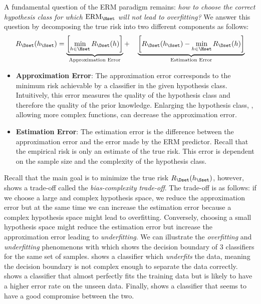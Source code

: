 A fundamental question of the ERM paradigm remains: \emph{how to choose the correct hypothesis class for which $\text{ERM}_\Hset$ will not lead to overfitting?} 
We answer this question by decomposing the true risk into two different components as follows: 
\begin{equation} \label{equation:ch2-bias_complexity_tradeoff}
  R_\Dset (h_\Sset) = 
  \underbrace{\left[ \min_{h \in \Hset} R_\Dset(h) \right]}_{\text{\scriptsize Approximation Error}} + \quad 
  \underbrace{\left[ R_\Dset(h_\Sset) - \min_{h \in \Hset} R_\Dset(h) \right]}_{\text{\scriptsize Estimation Error}} 
\end{equation}
\begin{itemize}
  \item \textbf{Approximation Error}: The approximation error corresponds to the minimum risk achievable by a classifier in the given hypothesis class.
  Intuitively, this error measures the quality of the hypothesis class and therefore the quality of the prior knowledge.
  Enlarging the hypothesis class, \ie, allowing more complex functions, can decrease the approximation error.
  \item \textbf{Estimation Error}: The estimation error is the difference between the approximation error and the error made by the ERM predictor.
  Recall that the empirical risk is only an estimate of the true risk.
  This error is dependent on the sample size and the complexity of the hypothesis class.
\end{itemize}
Recall that the main goal is to minimize the true risk $R_\Dset (h_\Sset)$, however,  shows a trade-off called the \emph{bias-complexity trade-off}.
The trade-off is as follows: if we choose a large and complex hypothesis space, we reduce the approximation error but at the same time we can increase the estimation error because a complex hypothesis space might lead to overfitting.
Conversely, choosing a small hypothesis space might reduce the estimation error but increase the approximation error leading to \emph{underfitting}.
We can illustrate the \emph{overfitting} and \emph{underfitting} phenomenons with  which shows the decision boundary of 3 classifiers for the same set of samples.
 shows a classifier which \emph{underfits} the data, meaning the decision boundary is not complex enough to separate the data correctly.
 shows a classifier that almost perfectly fits the training data but is likely to have a higher error rate on the unseen data.
Finally,  shows a classifier that seems to have a good compromise between the two.


